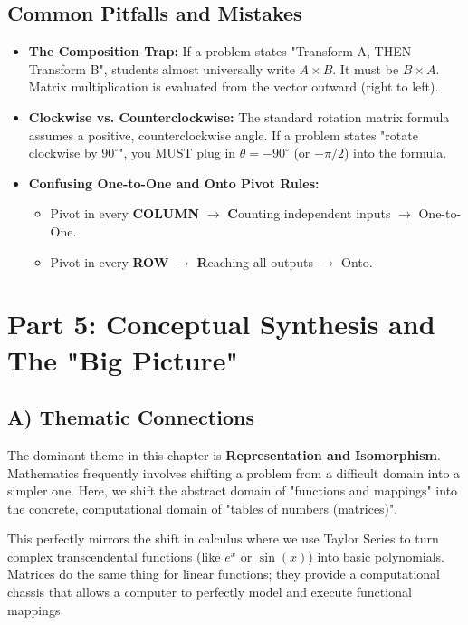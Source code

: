 \documentclass[11pt]{article}
\begin{document}
\subsection{Common Pitfalls and Mistakes}
\begin{itemize}
    \item \textbf{The Composition Trap:} If a problem states "Transform A, THEN Transform B", students almost universally write $A \times B$. It must be $B \times A$. Matrix multiplication is evaluated from the vector outward (right to left). 
    \item \textbf{Clockwise vs. Counterclockwise:} The standard rotation matrix formula assumes a positive, counterclockwise angle. If a problem states "rotate clockwise by $90^\circ$", you MUST plug in $\theta = -90^\circ$ (or $-\pi/2$) into the formula.
    \item \textbf{Confusing One-to-One and Onto Pivot Rules:}
    \begin{itemize}
        \item Pivot in every \textbf{COLUMN} $\to$ \textbf{C}ounting independent inputs $\to$ One-to-One.
        \item Pivot in every \textbf{ROW} $\to$ \textbf{R}eaching all outputs $\to$ Onto.
    \end{itemize}
\end{itemize}

\newpage
\section{Part 5: Conceptual Synthesis and The "Big Picture"}

\subsection{A) Thematic Connections}
The dominant theme in this chapter is \textbf{Representation and Isomorphism}. Mathematics frequently involves shifting a problem from a difficult domain into a simpler one. Here, we shift the abstract domain of "functions and mappings" into the concrete, computational domain of "tables of numbers (matrices)". 

This perfectly mirrors the shift in calculus where we use Taylor Series to turn complex transcendental functions (like $e^x$ or $\sin(x)$) into basic polynomials. Matrices do the same thing for linear functions; they provide a computational chassis that allows a computer to perfectly model and execute functional mappings.
\end{document}
